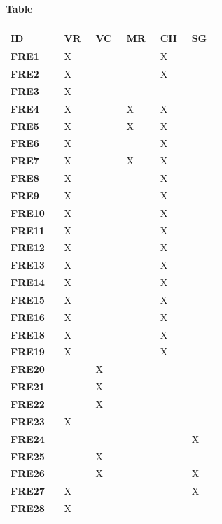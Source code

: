 \paragraph{Table}
\begin{longtable}
{| p{0.10\linewidth} |P{0.05\linewidth} | P{0.05\linewidth} | P{0.05\linewidth} | P{0.05\linewidth} | P{0.05\linewidth} |}
    \hline
    \textbf{ID} & \textbf{VR} & \textbf{VC}& \textbf{MR} & \textbf{CH}  & \textbf{SG} \T\B \\
    \hline 
    \hline
    \textbf{FRE1} & X & & &X &\T\B\\
    \hline
    \textbf{FRE2} & X & & &X &\T\B\\
    \hline
    \textbf{FRE3} & X & & & &\T\B\\
    \hline
    \textbf{FRE4} & X & &X &X &\T\B\\
    \hline
    \textbf{FRE5} & X & &X &X &\T\B\\
    \hline
    \textbf{FRE6} & X & & &X &\T\B\\
    \hline
    \textbf{FRE7} & X & &X &X &\T\B\\
    \hline
    \textbf{FRE8} & X & & &X &\T\B\\
    \hline
    \textbf{FRE9} & X & & &X &\T\B\\
    \hline
    \textbf{FRE10} & X & & &X &\T\B\\
    \hline
    \textbf{FRE11} & X & & &X &\T\B\\
    \hline
    \textbf{FRE12} & X & & &X &\T\B\\
    \hline
    \textbf{FRE13} & X & & &X &\T\B\\
    \hline
    \textbf{FRE14} & X & & &X &\T\B\\
    \hline
    \textbf{FRE15} & X & & &X &\T\B\\
    \hline
    \textbf{FRE16} & X & & &X &\T\B\\
    \hline
    \textbf{FRE18} & X & & &X &\T\B\\
    \hline
    \textbf{FRE19} & X & & &X &\T\B\\
    \hline
    \textbf{FRE20} &  &X & & &\T\B\\
    \hline
    \textbf{FRE21} &  &X & & &\T\B\\
    \hline
    \textbf{FRE22} &  &X & & &\T\B\\
    \hline
    \textbf{FRE23} &X & & & &\T\B\\
    \hline
    \textbf{FRE24} &  & & & &X\T\B\\
    \hline
    \textbf{FRE25} &  &X & & &\T\B\\
    \hline
    \textbf{FRE26} &  &X & & &X\T\B\\
    \hline
    \textbf{FRE27} &X  & & & &X\T\B\\
    \hline
    \textbf{FRE28} &X  & & & &\T\B\\
    \hline
\end{longtable}
\label{subsec:mappingOnMobileApplication}
